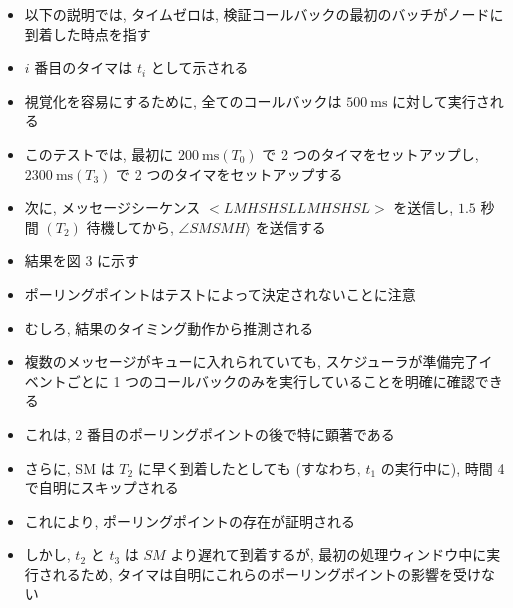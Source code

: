 \begin{frame}{}
    \begin{itemize}
        \item 以下の説明では, タイムゼロは, 検証コールバックの最初のバッチがノードに到着した時点を指す
\item $i$ 番目のタイマは $t_{i}$ として示される
\item 視覚化を容易にするために, 全てのコールバックは $500 \mathrm{~ms}$ に対して実行される
    \end{itemize}
\end{frame}

\begin{frame}{}
    \begin{itemize}
        \item このテストでは, 最初に $200 \mathrm{~ms}\left(T_{0}\right)$ で 2 つのタイマをセットアップし, $2300 \mathrm{~ms}\left(T_{3}\right)$ で 2 つのタイマをセットアップする
\item 次に, メッセージシーケンス $<L M H S H S L L M H S H S L>$ を送信し, $1.5$ 秒間 $\left(T_{2}\right)$ 待機してから, $\angle S M S M H\rangle$ を送信する
\item 結果を図 3 に示す
\item ポーリングポイントはテストによって決定されないことに注意
\item むしろ, 結果のタイミング動作から推測される
    \end{itemize}
\end{frame}

\begin{frame}{}
    \begin{itemize}
        \item 複数のメッセージがキューに入れられていても, スケジューラが準備完了イベントごとに 1 つのコールバックのみを実行していることを明確に確認できる
\item これは, 2 番目のポーリングポイントの後で特に顕著である
\item さらに, SM は $T_{2}$ に早く到着したとしても (すなわち,  $t_{1}$ の実行中に), 時間 4 で自明にスキップされる
\item これにより, ポーリングポイントの存在が証明される
\item しかし, $t_{2}$ と $t_{3}$ は $S M$ より遅れて到着するが, 最初の処理ウィンドウ中に実行されるため, タイマは自明にこれらのポーリングポイントの影響を受けない
    \end{itemize}
\end{frame}
